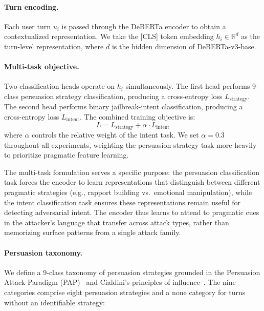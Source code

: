 \paragraph{Turn encoding.}
Each user turn $u_i$ is passed through the DeBERTa encoder to obtain a contextualized representation. We take the [CLS] token embedding $h_i \in \mathbb{R}^d$ as the turn-level representation, where $d$ is the hidden dimension of DeBERTa-v3-base.

\paragraph{Multi-task objective.}
Two classification heads operate on $h_i$ simultaneously. The first head performs 9-class persuasion strategy classification, producing a cross-entropy loss $L_{\text{strategy}}$. The second head performs binary jailbreak-intent classification, producing a cross-entropy loss $L_{\text{intent}}$. The combined training objective is:
\begin{equation}
  L = L_{\text{strategy}} + \alpha \cdot L_{\text{intent}}
  \label{eq:loss}
\end{equation}
where $\alpha$ controls the relative weight of the intent task. We set $\alpha = 0.3$ throughout all experiments, weighting the persuasion strategy task more heavily to prioritize pragmatic feature learning.

The multi-task formulation serves a specific purpose: the persuasion classification task forces the encoder to learn representations that distinguish between different pragmatic strategies (e.g., rapport building vs.\ emotional manipulation), while the intent classification task ensures these representations remain useful for detecting adversarial intent. The encoder thus learns to attend to pragmatic cues in the attacker's language that transfer across attack types, rather than memorizing surface patterns from a single attack family.

\paragraph{Persuasion taxonomy.}
We define a 9-class taxonomy of persuasion strategies grounded in the Persuasion Attack Paradigm (PAP)~\citep{zeng2024pap} and Cialdini's principles of influence~\citep{cialdini2001influence}. The nine categories comprise eight persuasion strategies and a none category for turns without an identifiable strategy:

